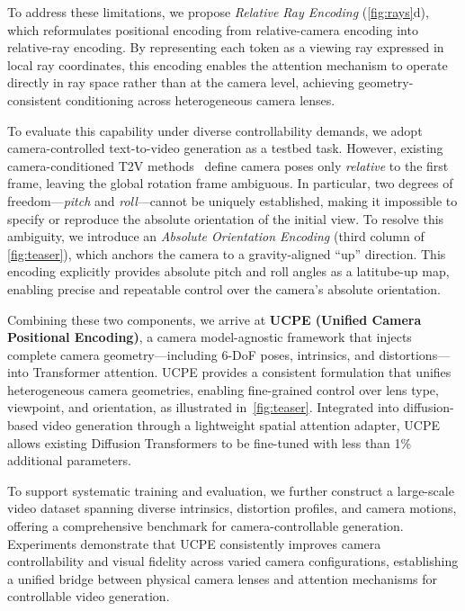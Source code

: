 To address these limitations, we propose \emph{Relative Ray Encoding} (\cref{fig:rays}d), which reformulates positional encoding from relative-camera encoding into relative-ray encoding.
By representing each token as a viewing ray expressed in local ray coordinates, this encoding enables the attention mechanism to operate directly in ray space rather than at the camera level, achieving geometry-consistent conditioning across heterogeneous camera lenses.

To evaluate this capability under diverse controllability demands, we adopt camera-controlled text-to-video generation as a testbed task.
However, existing camera-conditioned T2V methods~\cite{bahmani2025ac3d,he2024cameractrl} define camera poses only \emph{relative} to the first frame, leaving the global rotation frame ambiguous.
In particular, two degrees of freedom---\emph{pitch} and \emph{roll}---cannot be uniquely established, making it impossible to specify or reproduce the absolute orientation of the initial view.
To resolve this ambiguity, we introduce an \emph{Absolute Orientation Encoding} (third column of \cref{fig:teaser}), which anchors the camera to a gravity-aligned ``up'' direction.
This encoding explicitly provides absolute pitch and roll angles as a latitube-up map, enabling precise and repeatable control over the camera's absolute orientation.



Combining these two components, we arrive at \textbf{UCPE (Unified Camera Positional Encoding)}, a camera model-agnostic framework that injects complete camera geometry---including 6-DoF poses, intrinsics, and distortions---into Transformer attention.
UCPE provides a consistent formulation that unifies heterogeneous camera geometries, enabling fine-grained control over lens type, viewpoint, and orientation, as illustrated in~\cref{fig:teaser}.
Integrated into diffusion-based video generation through a lightweight spatial attention adapter, UCPE allows existing Diffusion Transformers to be fine-tuned with less than 1\% additional parameters.

To support systematic training and evaluation, we further construct a large-scale video dataset spanning diverse intrinsics, distortion profiles, and camera motions, offering a comprehensive benchmark for camera-controllable generation.
Experiments demonstrate that UCPE consistently improves camera controllability and visual fidelity across varied camera configurations, establishing a unified bridge between physical camera lenses and attention mechanisms for controllable video generation.


